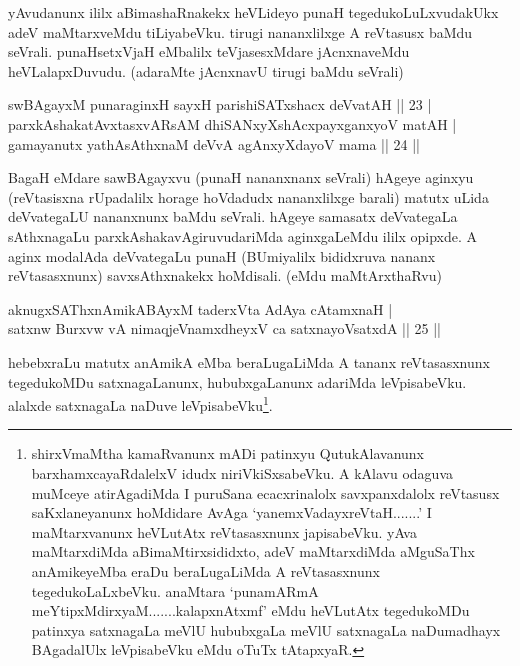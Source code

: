\begin{artha}
yAvudanunx ililx aBimashaRnakekx heVLideyo punaH tegedukoLuLxvudakUkx 
adeV maMtarxveMdu tiLiyabeVku. tirugi nananxlilxge A reVtasusx baMdu 
seVrali. punaHsetxVjaH eMbalilx teVjasesxMdare jAcnxnaveMdu 
heVLalapxDuvudu. (adaraMte jAcnxnavU tirugi baMdu seVrali)
\end{artha}


\begin{shl}
swBAgayxM punaraginxH sayxH parishiSATxshacx deVvatAH \hfill|| 23 | \\
parxkAshakatAvxtasxvARsAM dhiSANxyXshAcxpayxganxyoV matAH | \\
gamayanutx yathAsAthxnaM deVvA agAnxyXdayoV mama \hfill|| 24 || 
\end{shl}

\begin{artha}
BagaH eMdare sawBAgayxvu (punaH nananxnanx seVrali) hAgeye aginxyu 
(reVtasisxna rUpadalilx horage hoVdadudx nananxlilxge barali) matutx 
uLida deVvategaLU nananxnunx baMdu seVrali. hAgeye samasatx 
deVvategaLa sAthxnagaLu parxkAshakavAgiruvudariMda aginxgaLeMdu ililx 
opipxde. A aginx modalAda deVvategaLu punaH (BUmiyalilx bididxruva 
nananx reVtasasxnunx) savxsAthxnakekx hoMdisali. (eMdu maMtArxthaRvu)
\end{artha}


\begin{shl}
aknugxSAThxnAmikABAyxM taderxVta AdAya cA\s \s tamxnaH | \\
satxnw Burxvw vA nimaqjeVnamxdheyxV ca satxnayoVsatxdA \hfill|| 25 || 
\end{shl}

\begin{artha}
hebebxraLu matutx anAmikA eMba beraLugaLiMda A tananx reVtasasxnunx 
tegedukoMDu satxnagaLanunx, hububxgaLanunx adariMda leVpisabeVku. 
alalxde satxnagaLa naDuve leVpisabeVku\footnote[1]{shirxVmaMtha 
kamaRvanunx mADi patinxyu QutukAlavanunx barxhamxcayaRdalelxV idudx 
niriVkiSxsabeVku. A kAlavu odaguva muMceye atirAgadiMda I puruSana 
ecacxrinalolx savxpanxdalolx reVtasusx saKxlaneyanunx hoMdidare AvAga 
`yanemxVadayxreVtaH.......' I maMtarxvanunx heVLutAtx reVtasasxnunx 
japisabeVku. yAva maMtarxdiMda aBimaMtirxsididxto, adeV maMtarxdiMda 
aMguSaThx anAmikeyeMba eraDu beraLugaLiMda A reVtasasxnunx 
tegedukoLaLxbeVku. anaMtara `punamARmA meYtipxMdirxyaM.......kalapxnAtxmf' eMdu heVLutAtx tegedukoMDu 
patinxya satxnagaLa meVlU hububxgaLa meVlU satxnagaLa naDumadhayx 
BAgadalUlx leVpisabeVku eMdu oTuTx tAtapxyaR.}.
\end{artha}

